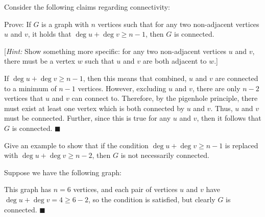 \documentclass[11pt]{article}
\begin{document}
Consider the following claims regarding connectivity:
\begin{Parts}
    \Part  Prove: If $G$ is a graph with $n$ vertices such that for any two non-adjacent vertices $u$ and $v$, it holds that $\deg u + \deg v \ge n - 1$, then $G$ is connected. 

 
    
    [\textit{Hint:} Show something more specific: for any two non-adjacent vertices $u$ and $v$, there must be a vertex $w$ such that $u$ and $v$ are both adjacent to $w$.]


    \begin{solution}
        If $\deg u + \deg v \ge n-1$, then this means that combined, $u$ and $v$ are connected to a minimum of $n-1$ vertices. However, excluding $u$ and $v$, there are only $n-2$ vertices that $u$ and $v$ can connect to. Therefore, by the pigenhole principle, there must exist at least one vertex which is both connected by $u$ and $v$. Thus, $u$ and $v$ must be connected. Further, since this is true for any $u$ and $v$, then it follows that $G$ is connected. $\blacksquare$
    \end{solution}


    \Part  Give an example to show that if the condition $\deg u + \deg v \ge n - 1$ is replaced with $\deg u + \deg v \ge n - 2$, then $G$ is not necessarily connected.

    \begin{solution}
        Suppose we have the following graph: 
        \begin{center}
        \end{center}

        This graph has $n = 6$ vertices, and each pair of vertices $u$ and $v$ have $\deg u + \deg v = 4 \ge 6-2$, so the condition is satisfied, but clearly $G$ is connected. $\blacksquare$

    \end{solution}


\end{Parts}
\end{document}
